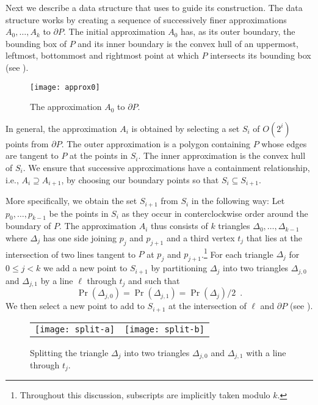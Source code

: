 \documentclass[charterfonts,lotsofwhite]{patmorin}
\newcommand{\boundary}{\partial}
\begin{document}
Next we describe a data structure that uses  to
guide its construction.   The data structure works by creating a
sequence of successively finer approximations $A_0,\ldots,A_k$ to
$\boundary P$.  The initial approximation $A_0$ has, as its outer
boundary, the bounding box of $P$ and its inner boundary is the convex
hull of an uppermost, leftmost, bottommost and rightmost point at
which $P$ intersects its bounding box (see ). 

\begin{figure}
\begin{center}\texttt{[image: approx0]}\end{center}
\caption{The approximation $A_0$ to $\boundary P$.}
\end{figure}

In general, the approximation $A_i$ is obtained by selecting a set
$S_i$ of $O(2^i)$ points from $\boundary P$.  The outer approximation
is a polygon containing $P$ whose edges are tangent to $P$ at the
points in $S_i$.  The inner approximation is the convex hull of $S_i$.
We ensure that successive approximations have a containment
relationship, i.e., $A_i\supseteq A_{i+1}$, by choosing our boundary
points so that $S_i\subseteq S_{i+1}$.

More specifically, we obtain the set $S_{i+1}$ from $S_i$ in the
following way:  Let $p_0,\ldots,p_{k-1}$ be the points in $S_i$ as
they occur in conterclockwise order around the boundary of $P$.  The
approximation $A_i$ thus consists of $k$ triangles
$\Delta_0,\ldots,\Delta_{k-1}$ where $\Delta_j$ has one side joining
$p_j$ and $p_{j+1}$ and a third vertex $t_j$ that lies at the
intersection of two lines tangent to $P$ at $p_j$ and
$p_{j+1}$.\footnote{Throughout this discussion, subscripts are
implicitly taken modulo $k$.}  For each triangle $\Delta_j$ for $0\le
j< k$ we add a new point to $S_{i+1}$  
by partitioning $\Delta_j$ into two triangles
$\Delta_{j,0}$ and $\Delta_{j,1}$ by a line $\ell$ through $t_j$ and such
that 
\[  
     \Pr(\Delta_{j,0}) = \Pr(\Delta_{j,1}) = \Pr(\Delta_{j})/2 \enspace .
\]
We then select a new point to add to $S_{i+1}$ at the intersection of
$\ell$ and $\boundary P$ (see ).

\begin{figure}
\begin{center}
\begin{tabular}{cc}
\texttt{[image: split-a]} & \texttt{[image: split-b]}
\end{tabular}
\end{center}
\caption{Splitting the triangle $\Delta_j$ into two triangles
$\Delta_{j,0}$ and $\Delta_{j,1}$ with a line through $t_j$.}
\end{figure}
\end{document}
